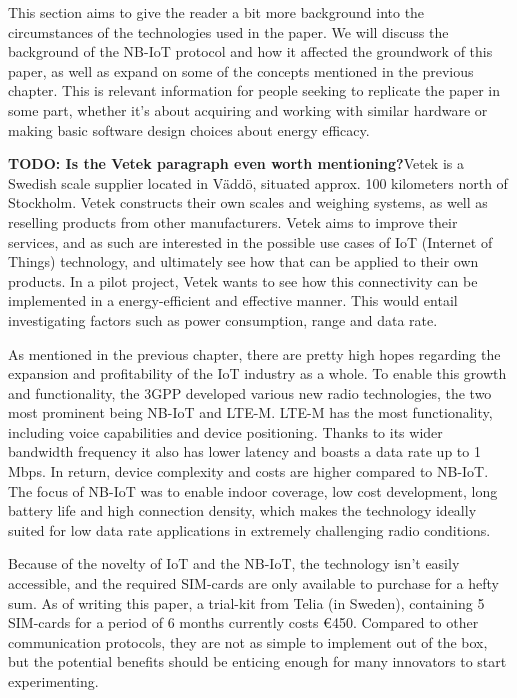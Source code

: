 
This section aims to give the reader a bit more background into the circumstances of the technologies used in the paper. We will discuss the background of the NB-IoT protocol and how it affected the groundwork of this paper, as well as expand on some of the concepts mentioned in the previous chapter. This is relevant information for people seeking to replicate the paper in some part, whether it's about acquiring and working with similar hardware or making basic software design choices about energy efficacy. 

\textbf{TODO: Is the Vetek paragraph even worth mentioning?}Vetek is a Swedish scale supplier located in Väddö, situated approx. 100 kilometers north of Stockholm. Vetek constructs their own scales and weighing systems, as well as reselling products from other manufacturers.\cite{vetek} Vetek aims to improve their services, and as such are interested in the possible use cases of IoT (Internet of Things) technology, and ultimately see how that can be applied to their own products. In a pilot project, Vetek wants to see how this connectivity can be implemented in a energy-efficient and effective manner. This would entail investigating factors such as power consumption, range and data rate.


As mentioned in the previous chapter, there are pretty high hopes regarding the expansion and profitability of the IoT industry as a whole. To enable this growth and functionality, the 3GPP developed various new radio technologies, the two most prominent being NB-IoT and LTE-M. LTE-M has the most functionality, including voice capabilities and device positioning. Thanks to its wider bandwidth frequency it also has lower latency and boasts a data rate up to 1 Mbps.\cite{ericsson-blog} In return, device complexity and costs are higher compared to NB-IoT. The focus of NB-IoT was to enable indoor coverage, low cost development, long battery life and high connection density, which makes the technology ideally suited for low data rate applications in extremely challenging radio conditions. 

Because of the novelty of IoT and the NB-IoT, the technology isn't easily accessible, and the required SIM-cards are only available to purchase for a hefty sum. As of writing this paper, a trial-kit from Telia (in Sweden), containing 5 SIM-cards for a period of 6 months currently costs €450.\cite{telia-nb}  Compared to other communication protocols, they are not as simple to implement out of the box, but the potential benefits should be enticing enough for many innovators to start experimenting.


